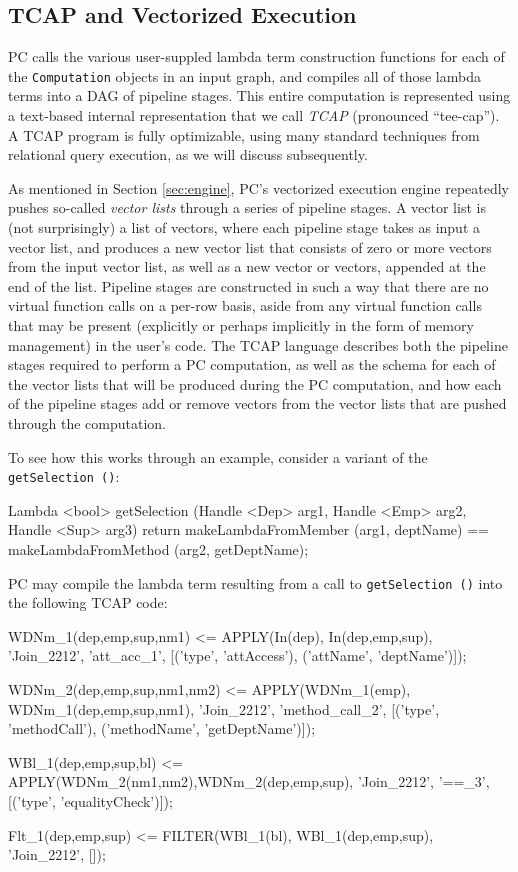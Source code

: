 \subsection{TCAP and Vectorized Execution} \label{sec:vectorized}


PC calls the various user-suppled lambda term construction functions for each of the \texttt{Computation} objects in an
input graph, and compiles all of those lambda terms into a DAG of pipeline stages.  
This entire computation is represented using a text-based internal representation that we call
\emph{TCAP} (pronounced ``tee-cap'').  A TCAP program is fully optimizable, using many standard techniques from relational query execution, as we
will discuss subsequently.

As mentioned in Section \ref{sec:engine}, PC's vectorized execution engine repeatedly pushes 
so-called \emph{vector lists} through a series of pipeline stages.  A vector list is (not surprisingly) a list of vectors, where each pipeline stage
takes as input a vector list,
and produces a 
new vector list that consists of zero or more vectors from the input vector list, as well as a new vector or vectors, appended at the end of the list.
Pipeline stages are constructed in such a way that there are no virtual function calls on a per-row basis, aside from any virtual function calls that may be
present (explicitly or perhaps implicitly in the form of memory management) in the user's code.
The TCAP language describes both the pipeline stages required to perform a PC computation, as well as the schema for each of the vector lists that
will be produced during the PC computation, and how each of the pipeline stages add or remove vectors from the vector lists that are pushed through
the computation.

To see how this works through an example, consider a variant of the \texttt{getSelection ()}:

\begin{codesmall} 
Lambda <bool> getSelection (Handle <Dep> arg1, Handle <Emp> arg2, Handle <Sup> arg3) {
	return makeLambdaFromMember (arg1, deptName) == 
	       makeLambdaFromMethod (arg2, getDeptName);  }
\end{codesmall}

\noindent PC may compile the lambda term resulting from a call to \texttt{getSelection ()} into the following TCAP code:

\begin{codesmall}
WDNm_1(dep,emp,sup,nm1) <= APPLY(In(dep), In(dep,emp,sup), 'Join_2212', 'att_acc_1', 
  [('type', 'attAccess'), ('attName', 'deptName')]);

WDNm_2(dep,emp,sup,nm1,nm2) <= APPLY(WDNm_1(emp), WDNm_1(dep,emp,sup,nm1), 'Join_2212',
  'method_call_2', [('type', 'methodCall'), ('methodName', 'getDeptName')]);

WBl_1(dep,emp,sup,bl) <= APPLY(WDNm_2(nm1,nm2),WDNm_2(dep,emp,sup), 'Join_2212', '==_3', 
  [('type', 'equalityCheck')]);

Flt_1(dep,emp,sup) <= FILTER(WBl_1(bl), WBl_1(dep,emp,sup), 'Join_2212', []);
\end{codesmall}

